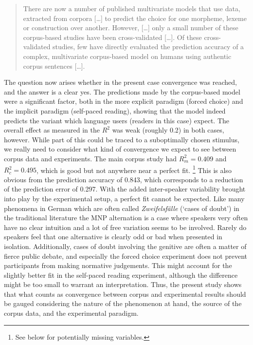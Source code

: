 \begin{quote}
  There are now a number of published multivariate models that use data, extracted from corpora [\ldots] to predict the choice for one morpheme, lexeme or construction over another.
  However, [\ldots] only a small number of these corpus-based studies have been cross-validated [\ldots].
  Of these cross- validated studies, few have directly evaluated the prediction accuracy of a complex, multivariate corpus-based model on humans using authentic corpus sentences [\ldots].
\end{quote}

The question now arises whether in the present case convergence was reached, and the answer is a clear yes.
The predictions made by the corpus-based model were a significant factor, both in the more explicit paradigm (forced choice) and the implicit paradigm (self-paced reading), showing that the model indeed predicts the variant which language users (readers in this case) expect.
The overall effect as measured in the $R^2$ was weak (roughly 0.2) in both cases, however.
While part of this could be traced to a suboptimally chosen stimulus, we really need to consider what kind of convergence we expect to see between corpus data and experiments.
The main corpus study had $R^2_m=0.409$ and $R^2_c=0.495$, which is good but not anywhere near a perfect fit.%
\footnote{See below for potentially missing variables.}
This is also obvious from the prediction accuracy of 0.843, which corresponds to a reduction of the prediction error of 0.297.
With the added inter-speaker variability brought into play by the experimental setup, a perfect fit cannot be expected.
Like many phenomena in German which are often called \textit{Zweifelsfälle} (`cases of doubt') in the traditional literature \citep{Duden09,Klein2009} the MNP alternation is a case where speakers very often have no clear intuition and a lot of free variation seems to be involved.
Rarely do speakers feel that one alternative is clearly odd or bad when presented in isolation.
Additionally, cases of doubt involving the genitive are often a matter of fierce public debate, and especially the forced choice experiment does not prevent participants from making normative judgements.
This might account for the slightly better fit in the self-paced reading experiment, although the difference might be too small to warrant an interpretation.
Thus, the present study shows that what counts as convergence between corpus and experimental results should be gauged considering the nature of the phenomenon at hand, the source of the corpus data, and the experimental paradigm.

